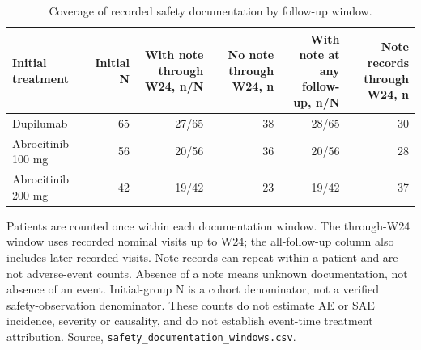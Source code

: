 \begin{table}[htbp]
\centering\small
\caption{Coverage of recorded safety documentation by follow-up window.}\label{tab:safety_documentation}
\begin{tabular}{p{31mm}rrrrr}\toprule
Initial treatment & Initial N & \shortstack{With note through\\W24, n/N} & \shortstack{No note through\\W24, n} & \shortstack{With note at any\\follow-up, n/N} & \shortstack{Note records\\through W24, n} \\ \midrule
Dupilumab & 65 & 27/65 & 38 & 28/65 & 30 \\
Abrocitinib 100 mg & 56 & 20/56 & 36 & 20/56 & 28 \\
Abrocitinib 200 mg & 42 & 19/42 & 23 & 19/42 & 37 \\
\bottomrule\end{tabular}
\par\small\raggedright Patients are counted once within each documentation window. The through-W24 window uses recorded nominal visits up to W24; the all-follow-up column also includes later recorded visits. Note records can repeat within a patient and are not adverse-event counts. Absence of a note means unknown documentation, not absence of an event. Initial-group N is a cohort denominator, not a verified safety-observation denominator. These counts do not estimate AE or SAE incidence, severity or causality, and do not establish event-time treatment attribution. Source, \texttt{safety\_documentation\_windows.csv}.
\end{table}
